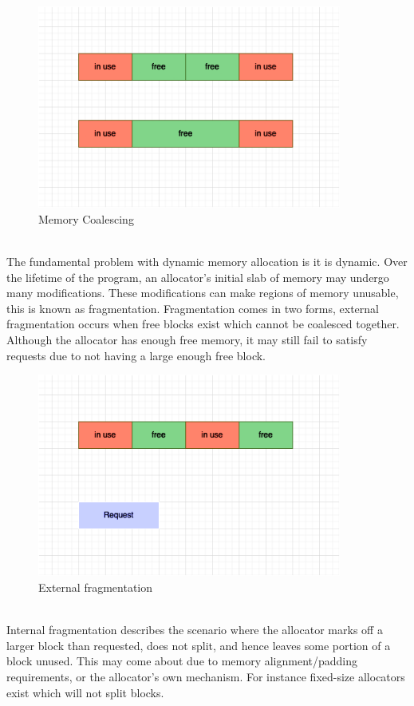 \documentclass{article}
\begin{document}
\begin{figure}[htbp]
	\centering
	\includegraphics[width=10cm]{coalesce}
	\captionsetup{width=10cm}
	\caption{Memory Coalescing}
\end{figure}
\\
The fundamental problem with dynamic memory allocation is it is dynamic. Over the lifetime of the program, an allocator's initial slab of memory may undergo many modifications. These modifications can make regions of memory unusable, this is known as fragmentation. Fragmentation comes in two forms, external fragmentation occurs when free blocks exist which cannot be coalesced together. Although the allocator has enough free memory, it may still fail to satisfy requests due to not having a large enough free block.\\
\pagebreak
\begin{figure}[htbp]
	\centering
	\includegraphics[width=10cm]{external_fragmentation}
	\captionsetup{width=10cm}
	\caption{External fragmentation}
\end{figure}
\\
Internal fragmentation describes the scenario where the allocator marks off a larger block than requested, does not split, and hence leaves some portion of a block unused. This may come about due to memory alignment/padding requirements, or the allocator's own mechanism. For instance fixed-size allocators exist which will not split blocks.\\
\end{document}
